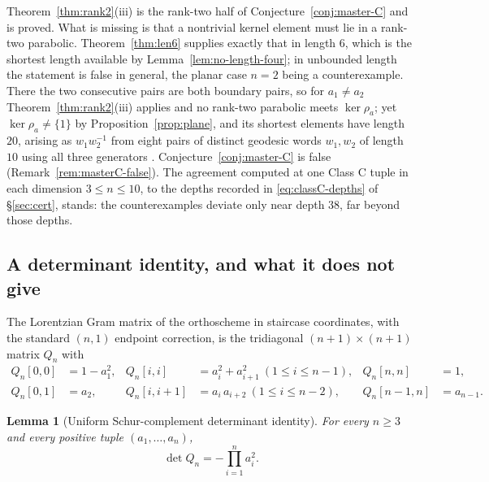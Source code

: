 \documentclass[11pt,a4paper]{article}
\newtheorem{lemma}[theorem]{Lemma}
\theoremstyle{definition}
\theoremstyle{remark}
\theoremstyle{plain}
\begin{document}
Theorem~\ref{thm:rank2}(iii) is the rank-two half of Conjecture~\ref{conj:master-C} and is
proved. What is missing is that a nontrivial kernel element must lie in a rank-two parabolic.
Theorem~\ref{thm:len6} supplies exactly that in length $6$, which is the shortest length
available by Lemma~\ref{lem:no-length-four}; in unbounded length the statement is false in
general, the planar case $n=2$ being a counterexample. There the two consecutive
pairs are both boundary pairs, so for $a_1\ne a_2$ Theorem~\ref{thm:rank2}(iii) applies and no
rank-two parabolic meets $\ker\rho_a$; yet $\ker\rho_a\ne\{1\}$ by
Proposition~\ref{prop:plane}, and its shortest elements have length $20$, arising as
$w_1w_2^{-1}$ from eight pairs of distinct geodesic words $w_1,w_2$ of length $10$ using all
three generators \cite{Bonfioli1}. Conjecture~\ref{conj:master-C} is false
(Remark~\ref{rem:masterC-false}). The agreement computed at one Class C tuple in each dimension
$3\le n\le10$, to the depths recorded in \eqref{eq:classC-depths} of \S\ref{sec:cert}, stands:
the counterexamples deviate only near depth $38$, far beyond those depths.

\subsection{A determinant identity, and what it does not give}

The Lorentzian Gram matrix of the orthoscheme in staircase coordinates, with the standard
$(n,1)$ endpoint correction, is the tridiagonal $(n+1)\times(n+1)$ matrix $Q_n$ with
\begin{align*}
Q_n[0,0]&=1-a_1^2, & Q_n[i,i]&=a_i^2+a_{i+1}^2\ (1\le i\le n-1), & Q_n[n,n]&=1,\\
Q_n[0,1]&=a_2,     & Q_n[i,i+1]&=a_i\,a_{i+2}\ (1\le i\le n-2),   & Q_n[n-1,n]&=a_{n-1}.
\end{align*}

\begin{lemma}[Uniform Schur-complement determinant identity]\label{lem:uniform-detQ}
For every $n\ge3$ and every positive tuple $(a_1,\dots,a_n)$,
\[
\det Q_n=-\prod_{i=1}^{n}a_i^2 .
\]
\end{lemma}
\end{document}

